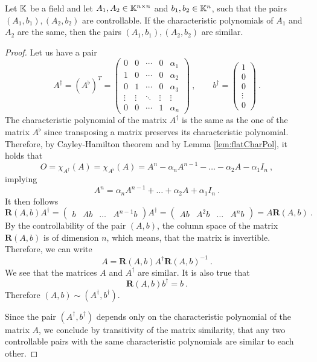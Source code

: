 \begin{lemma}
\label{lem:simCont}
    Let $\mathbb{K}$ be a field and let $A_1,A_2\in\mathbb{K}^{n\times n}$ and $b_1,b_2\in\mathbb{K}^n$, such that the pairs $(A_1,b_1),(A_2,b_2)$ are controllable. If the characteristic polynomials of $A_1$ and $A_2$ are the same, then the pairs $(A_1,b_1),(A_2,b_2)$ are similar.
\end{lemma}

\begin{proof}
    Let us have a pair
    $$A^\dagger=(A^\flat)^T=
    \begin{pmatrix}
        0 & 0 & \cdots & 0 & \alpha_1 \\
        1 & 0 & \cdots & 0 & \alpha_2 \\
        0 & 1 & \cdots & 0 & \alpha_3 \\
        \vdots & \vdots & \ddots & \vdots & \vdots \\
        0 & 0 & \cdots & 1 & \alpha_n
    \end{pmatrix}\ ,\qquad
    b^\dagger=
    \begin{pmatrix}
        1 \\ 0 \\ 0 \\ \vdots \\ 0
    \end{pmatrix}\ .$$
    The characteristic polynomial of the matrix $A^\dagger$ is the same as the one of the matrix $A^\flat$ since transposing a matrix preserves its characteristic polynomial. Therefore, by Cayley-Hamilton theorem and by Lemma \ref{lem:flatCharPol}, it holds that
    $$O=\chi_{A^\dagger}(A)=\chi_{A^\flat}(A)=A^n-\alpha_nA^{n-1}-\ldots-\alpha_2A-\alpha_1I_n\ ,$$
    implying
    $$A^n=\alpha_nA^{n-1}+\ldots+\alpha_2A+\alpha_1I_n\ .$$
    It then follows 
    $$\mathbf{R}(A,b)A^\dagger=
        \begin{pmatrix} 
            b & Ab & \ldots & A^{n-1}b
        \end{pmatrix}
    A^\dagger=
        \begin{pmatrix}
            Ab & A^2b & \ldots & A^nb
        \end{pmatrix}
    =A\mathbf{R}(A,b)\ .$$
    By the controllability of the pair $(A,b)$, the column space of the matrix $\mathbf{R}(A,b)$ is of dimension $n$, which means, that the matrix is invertible. Therefore, we can write 
    $$A=\mathbf{R}(A,b)A^\dagger\mathbf{R}(A,b)^{-1}\ .$$
    We see that the matrices $A$ and $A^\dagger$ are similar. It is also true that $$\mathbf{R}(A,b)b^\dagger=b\ .$$ Therefore $(A,b)\sim(A^\dagger,b^\dagger)$.

    Since the pair $(A^\dagger,b^\dagger)$ depends only on the characteristic polynomial of the matrix $A$, we conclude by transitivity of the matrix similarity, that any two controllable pairs with the same characteristic polynomials are similar to each other.
\end{proof}

